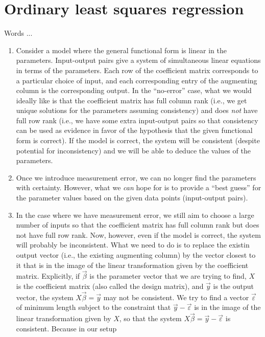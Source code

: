 \documentclass[10pt]{amsart}
\begin{document}
\section{Ordinary least squares regression}

Words ...

\begin{enumerate}
\item Consider a model where the general functional form is linear in
  the parameters. Input-output pairs give a system of simultaneous
  linear equations in terms of the parameters. Each row of the
  coefficient matrix corresponds to a particular choice of input, and
  each corresponding entry of the augmenting column is the
  corresponding output. In the ``no-error'' case, what we would
  ideally like is that the coefficient matrix has full column rank
  (i.e., we get unique solutions for the parameters assuming
  consistency) and does {\em not} have full row rank (i.e., we have
  some extra input-output pairs so that consistency can be used as
  evidence in favor of the hypothesis that the given functional form
  is correct). If the model is correct, the system will be consistent
  (despite potential for inconsistency) and we will be able to deduce
  the values of the parameters.
\item Once we introduce measurement error, we can no longer find the
  parameters with certainty. However, what we {\em can} hope for is to
  provide a ``best guess'' for the parameter values based on the given
  data points (input-output pairs).
\item In the case where we have measurement error, we still aim to
  choose a large number of inputs so that the coefficient matrix has
  full column rank but does not have full row rank. Now, however, even
  if the model is correct, the system will probably be
  inconsistent. What we need to do is to replace the existin output
  vector (i.e., the existing augmenting column) by the vector closest
  to it that is in the image of the linear transformation given by the
  coefficient matrix. Explicitly, if $\vec{\beta}$ is the parameter
  vector that we are trying to find, $X$ is the coefficient matrix
  (also called the design matrix), and $\vec{y}$ is the output vector,
  the system $X\vec{\beta} = \vec{y}$ may not be consistent. We try to
  find a vector $\vec{\varepsilon}$ of minimum length subject to the
  constraint that $\vec{y} - \vec{\varepsilon}$ is in the image of the
  linear transformation given by $X$, so that the system $X\vec{\beta}
  = \vec{y} - \vec{\varepsilon}$ is consistent. Because in our setup

\end{enumerate}
\end{document}

